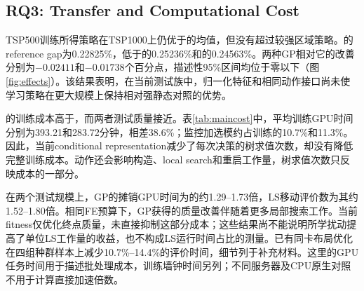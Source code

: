 \subsection{RQ3: Transfer and Computational Cost}
TSP500训练所得策略在TSP1000上仍优于\Ueight{}的均值，但没有超过较强区域策略。\Rsixteen{}的reference gap为0.22825\%，低于\JS{}的0.25236\%和\CT{}的0.24563\%。两种GP相对它的改善分别为$-0.02411$和$-0.01738$个百分点，描述性95\%区间均位于零以下（图\ref{fig:effects}）。该结果表明，在当前测试族中，归一化特征和相同动作接口尚未使学习策略在更大规模上保持相对强静态对照的优势。

\begin{table}[tb]
\caption{计算成本。训练及监控／选模为每次GP运行的平均GPU任务分钟；测试列为TSP500每1280次求解的批处理摊销时间总和及每FE的平均LS移动评价数，GP再平均3个seed。静态策略不需要GP训练。}
\label{tab:maincost}
\centering\small{}
\end{table}

\CT{}的训练成本高于\JS{}，而两者测试质量接近。表\ref{tab:maincost}中，平均训练GPU时间分别为393.21和283.72分钟，相差38.6\%；监控加选模约占训练的10.7\%和11.3\%。因此，当前conditional representation减少了每次决策的树求值次数，却没有降低完整训练成本。动作还会影响构造、local search和重启工作量，树求值次数只反映成本的一部分。

在两个测试规模上，GP的摊销GPU时间为\Ueight{}的约1.29--1.73倍，LS移动评价数为其约1.52--1.80倍。相同FE预算下，GP获得的质量改善伴随着更多局部搜索工作。当前fitness仅优化终点质量，未直接抑制这部分成本；这些结果尚不能说明所学扰动提高了单位LS工作量的收益，也不构成LS运行时间占比的测量。已有同卡布局优化在四组种群样本上减少10.7\%--14.4\%的评价时间，细节列于补充材料。这里的GPU任务时间用于描述批处理成本，训练墙钟时间另列；不同服务器及CPU原生对照不用于计算直接加速倍数。
